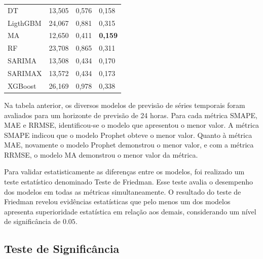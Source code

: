 \begin{table}[!htb]
\begin{tabular}{llll}
		DT                                  & 13,505                             & 0,576                            & 0,158                              \\
		LigthGBM                            & 24,067                             & 0,881                            & 0,315                              \\
		MA                                  & 12,650                             & 0,411                            & \textbf{0,159}                              \\
		RF                                  & 23,708                             & 0,865                            & 0,311                              \\
		SARIMA                              & 13,508                             & 0,434                            & 0,170                              \\
		SARIMAX                             & 13,572                             & 0,434                            & 0,173                              \\
		XGBoost                             & 26,169                             & 0,978                            & 0,338                              \\ \bottomrule

	\end{tabular}
\end{table}

Na tabela anterior, os diversos modelos de previsão de séries temporais foram avaliados para um horizonte de previsão de 24 horas. Para cada métrica SMAPE, MAE e RRMSE, identificou-se o modelo que apresentou o menor valor. A métrica SMAPE indicou que o modelo Prophet obteve o menor valor. Quanto à métrica MAE, novamente o modelo Prophet demonstrou o menor valor, e com a métrica RRMSE, o modelo MA demonstrou o menor valor da métrica.

Para validar estatisticamente as diferenças entre os modelos, foi realizado um teste estatístico denominado Teste de Friedman. Esse teste avalia o desempenho dos modelos em todas as métricas simultaneamente. O resultado do teste de Friedman revelou evidências estatísticas que pelo menos um dos modelos apresenta superioridade estatística em relação aos demais, considerando um nível de significância de $0.05$.



\subsection{Teste de Signific\^ancia}

